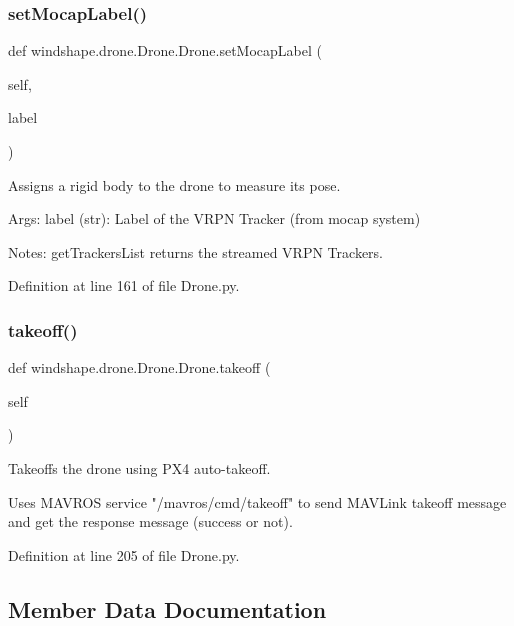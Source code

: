 \subsubsection{\texorpdfstring{set\+Mocap\+Label()}{setMocapLabel()}}
{\footnotesize\ttfamily def windshape.\+drone.\+Drone.\+Drone.\+set\+Mocap\+Label (\begin{DoxyParamCaption}\item[{}]{self,  }\item[{}]{label }\end{DoxyParamCaption})}

\begin{DoxyVerb}Assigns a rigid body to the drone to measure its pose.

Args:
    label (str): Label of the VRPN Tracker (from mocap system)
    
Notes:
    getTrackersList returns the streamed VRPN Trackers.
\end{DoxyVerb}
 

Definition at line 161 of file Drone.\+py.

\mbox{\label{classwindshape_1_1drone_1_1_drone_1_1_drone_a76ec9fc58bfe4b6ddb8ab5739bfdd2ea}} 
\subsubsection{\texorpdfstring{takeoff()}{takeoff()}}
{\footnotesize\ttfamily def windshape.\+drone.\+Drone.\+Drone.\+takeoff (\begin{DoxyParamCaption}\item[{}]{self }\end{DoxyParamCaption})}

\begin{DoxyVerb}Takeoffs the drone using PX4 auto-takeoff.

Uses MAVROS service "/mavros/cmd/takeoff" to send MAVLink
takeoff message and get the response message (success or not).
\end{DoxyVerb}
 

Definition at line 205 of file Drone.\+py.



\subsection{Member Data Documentation}
\mbox{\label{classwindshape_1_1drone_1_1_drone_1_1_drone_a4c87638c6657286a90b0141e456e90bb}} 
